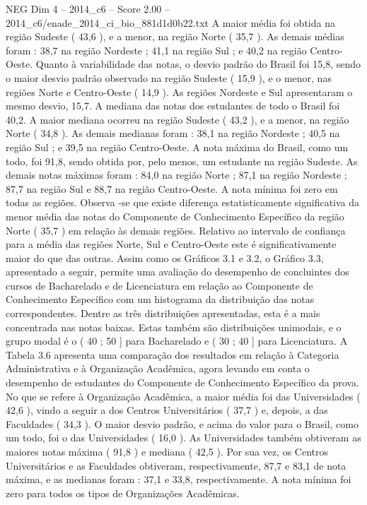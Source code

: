 \begin{textsample}{NEG Dim 4 – 2014\_c6 – Score 2.00 – 2014\_c6/enade\_2014\_ci\_bio\_881d1d0b22.txt}
A maior média foi obtida na região Sudeste ( 43,6 ), e a menor, na região Norte ( 35,7 ).
As demais médias foram : 38,7 na região Nordeste ; 41,1 na região Sul ; e 40,2 na região Centro-Oeste.
Quanto à variabilidade das notas, o desvio padrão do Brasil foi 15,8, sendo o maior desvio padrão observado na região Sudeste ( 15,9 ), e o menor, nas regiões Norte e Centro-Oeste ( 14,9 ).
As regiões Nordeste e Sul apresentaram o mesmo desvio, 15,7.
A mediana das notas dos estudantes de todo o Brasil foi 40,2.
A maior mediana ocorreu na região Sudeste ( 43,2 ), e a menor, na região Norte ( 34,8 ).
As demais medianas foram : 38,1 na região Nordeste ; 40,5 na região Sul ; e 39,5 na região Centro-Oeste.
A nota máxima do Brasil, como um todo, foi 91,8, sendo obtida por, pelo menos, um estudante na região Sudeste.
As demais notas máximas foram : 84,0 na região Norte ; 87,1 na região Nordeste ; 87,7 na região Sul e 88,7 na região Centro-Oeste.
A nota mínima foi zero em todas as regiões.
Observa -se que existe diferença estatisticamente significativa da menor média das notas do Componente de Conhecimento Específico da região Norte ( 35,7 ) em relação às demais regiões.
Relativo ao intervalo de confiança para a média das regiões Norte, Sul e Centro-Oeste este é significativamente maior do que das outras.
Assim como os Gráficos 3.1 e 3.2, o Gráfico 3.3, apresentado a seguir, permite uma avaliação do desempenho de concluintes dos cursos de Bacharelado e de Licenciatura em relação ao Componente de Conhecimento Específico com um histograma da distribuição das notas correspondentes.
Dentre as três distribuições apresentadas, esta é a mais concentrada nas notas baixas.
Estas também são distribuições unimodais, e o grupo modal é o ( 40 ; 50 ] para Bacharelado e ( 30 ; 40 ] para Licenciatura.
A Tabela 3.6 apresenta uma comparação dos resultados em relação à Categoria Administrativa e à Organização Acadêmica, agora levando em conta o desempenho de estudantes do Componente de Conhecimento Específico da prova.
No que se refere à Organização Acadêmica, a maior média foi das Universidades ( 42,6 ), vindo a seguir a dos Centros Universitários ( 37,7 ) e, depois, a das Faculdades ( 34,3 ).
O maior desvio padrão, e acima do valor para o Brasil, como um todo, foi o das Universidades ( 16,0 ).
As Universidades também obtiveram as maiores notas máxima ( 91,8 ) e mediana ( 42,5 ).
Por sua vez, os Centros Universitários e as Faculdades obtiveram, respectivamente, 87,7 e 83,1 de nota máxima, e as medianas foram : 37,1 e 33,8, respectivamente.
A nota mínima foi zero para todos os tipos de Organizações Acadêmicas.

\end{textsample}
